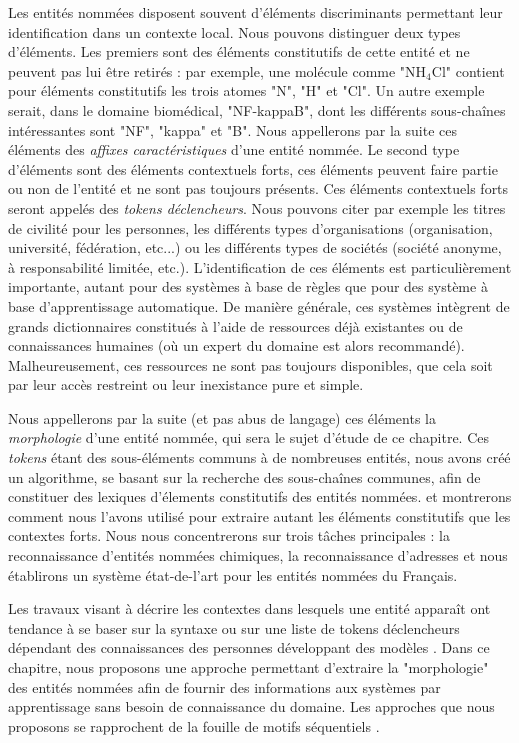 \documentclass[PhD-Yoann-Dupont.tex]{subfiles}
\begin{document}
Les entités nommées disposent souvent d'éléments discriminants permettant leur identification dans un contexte local. Nous pouvons distinguer deux types d'éléments. Les premiers sont des éléments constitutifs de cette entité et ne peuvent pas lui être retirés : par exemple, une molécule comme "NH$_{4}$Cl" contient pour éléments constitutifs les trois atomes "N", "H" et "Cl". Un autre exemple serait, dans le domaine biomédical, "NF-kappaB", dont les différents sous-chaînes intéressantes sont "NF", "kappa" et "B". Nous appellerons par la suite ces éléments des \emph{affixes caractéristiques} d'une entité nommée. Le second type d'éléments sont des éléments contextuels forts, ces éléments peuvent faire partie ou non de l'entité et ne sont pas toujours présents. Ces éléments contextuels forts seront appelés des \emph{tokens déclencheurs}. Nous pouvons citer par exemple les titres de civilité pour les personnes, les différents types d'organisations (organisation, université, fédération, etc...) ou les différents types de sociétés (société anonyme, à responsabilité limitée, etc.). L'identification de ces éléments est particulièrement importante, autant pour des systèmes à base de règles que pour des système à base d'apprentissage automatique. De manière générale, ces systèmes intègrent de grands dictionnaires constitués à l'aide de ressources déjà existantes ou de connaissances humaines (où un expert du domaine est alors recommandé). Malheureusement, ces ressources ne sont pas toujours disponibles, que cela soit par leur accès restreint ou leur inexistance pure et simple.

Nous appellerons par la suite (et pas abus de langage) ces éléments la \emph{morphologie} d'une entité nommée, qui sera le sujet d'étude de ce chapitre. Ces \emph{tokens} étant des sous-éléments communs à de nombreuses entités, nous avons créé un algorithme, se basant sur la recherche des sous-chaînes communes, afin de constituer des lexiques d'élements constitutifs des entités nommées. et montrerons comment nous l'avons utilisé pour extraire autant les éléments constitutifs que les contextes forts. Nous nous concentrerons sur trois tâches principales : la reconnaissance d'entités nommées chimiques, la reconnaissance d'adresses et nous établirons un système état-de-l'art pour les entités nommées du Français.

Les travaux visant à décrire les contextes dans lesquels une entité apparaît ont tendance à se baser sur la syntaxe \citep{holat2016fouille} ou sur une liste de tokens déclencheurs dépendant des connaissances des personnes développant des modèles \citep{leaman2013ncbi}. Dans ce chapitre, nous proposons une approche permettant d'extraire la "morphologie" des entités nommées afin de fournir des informations aux systèmes par apprentissage sans besoin de connaissance du domaine. Les approches que nous proposons se rapprochent de la fouille de motifs séquentiels \citep{agrawal1995mining,cellier2010fouille}.
\end{document}
